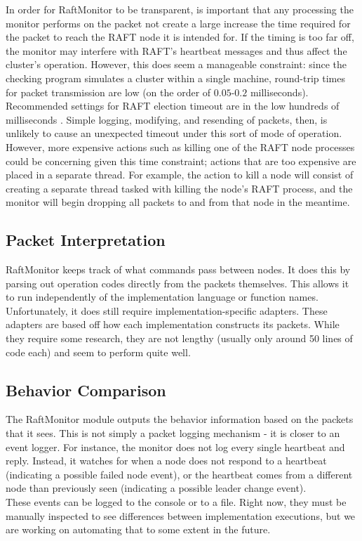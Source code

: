 \documentclass[UTF8]{article}
\begin{document}
In order for RaftMonitor to be transparent, is important that any processing the monitor performs on the packet not create a large increase the time required for the packet to reach the RAFT node it is intended for. If the timing is too far off, the monitor may interfere with RAFT's heartbeat messages and thus affect the cluster's operation. However, this does seem a manageable constraint: since the checking program simulates a cluster within a single machine, round-trip times for packet transmission are low (on the order of $0.05$-$0.2$ milliseconds). Recommended settings for RAFT election timeout are in the low hundreds of milliseconds \cite{raftPaper}. Simple logging, modifying, and resending of packets, then, is unlikely to cause an unexpected timeout under this sort of mode of operation. However, more expensive actions such as killing one of the RAFT node processes could be concerning given this time constraint; actions that are too expensive are placed in a separate thread. For example, the action to kill a node will consist of creating a separate thread tasked with killing the node's RAFT process, and the monitor will begin dropping all packets to and from that node in the meantime.

\subsection{Packet Interpretation}
RaftMonitor keeps track of what commands pass between nodes. It does this by parsing out operation codes directly from the packets themselves. This allows it to run independently of the implementation language or function names. Unfortunately, it does still require implementation-specific adapters. These adapters are based off how each implementation constructs its packets. While they require some research, they are not lengthy (usually only around 50 lines of code each) and seem to perform quite well.

\subsection{Behavior Comparison}
The RaftMonitor module outputs the behavior information based on the packets that it sees. This is not simply a packet logging mechanism - it is closer to an event logger. For instance, the monitor does not log every single heartbeat and reply. Instead, it watches for when a node does not respond to a heartbeat (indicating a possible failed node event), or the heartbeat comes from a different node than previously seen (indicating a possible leader change event). 
\\ \indent These events can be logged to the console or to a file. Right now, they must be manually inspected to see differences between implementation executions, but we are working on automating that to some extent in the future.
\end{document}
